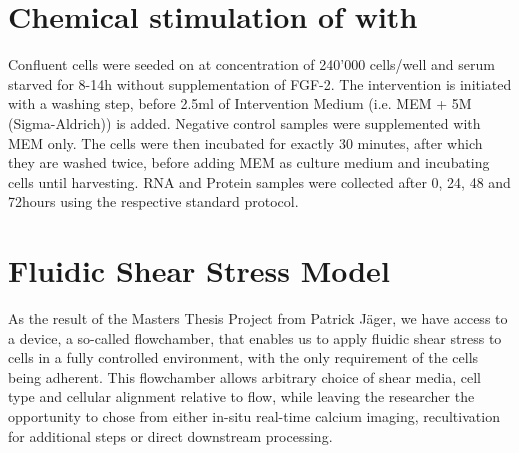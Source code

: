 \section{Chemical stimulation of \Piezo{} with \Yoda{}}
\label{sec:ChemicalStim}
Confluent cells were seeded on  at concentration of 240'000 cells/well and serum starved for 8-14h without supplementation of FGF-2. 
The intervention is initiated with a washing step, before 2.5ml of Intervention Medium (i.e. MEM\textalpha{} + 5\textmu{}M \Yoda (Sigma-Aldrich)) is added. Negative control samples were supplemented with MEM\textalpha{} only. The cells were then incubated for exactly 30 minutes, after which they are washed twice, before adding MEM\textalpha{} as culture medium and incubating cells until harvesting. RNA and Protein samples were collected after 0, 24, 48 and 72hours using the respective standard protocol.\\ 

\section{Fluidic Shear Stress Model}
As the result of the Masters Thesis Project from Patrick Jäger, we have access to a device, a so-called flowchamber, that enables us to apply fluidic shear stress to cells in a fully controlled environment, with the only requirement of the cells being adherent. This flowchamber allows arbitrary choice of shear media, cell type and cellular alignment relative to flow, while leaving the researcher the opportunity to chose from either in-situ real-time calcium imaging, recultivation for additional steps or direct downstream processing.


